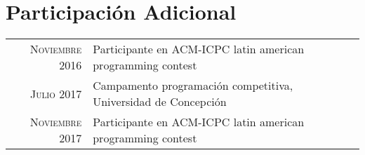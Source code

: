 \documentclass[a4paper,10pt]{article} %
\begin{document}







\section{Participaci\'on Adicional}

\begin{tabular}{rl}
\textsc{Noviembre} 2016 & Participante en ACM-ICPC latin american programming contest\\

\textsc{Julio} 2017 & Campamento programaci\'on competitiva, Universidad de Concepci\'on\\

\textsc{Noviembre} 2017 & Participante en ACM-ICPC latin american programming contest\\

\end{tabular}

\end{document}
